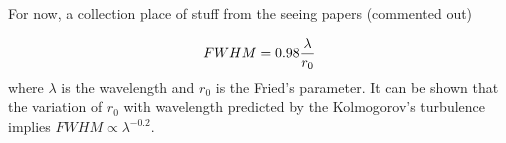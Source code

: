 
 
For now, a collection place of stuff from the seeing papers (commented out)






\begin{equation} 
FWHM = 0.98 {\lambda \over r_0} 
\end{equation} 
where $\lambda$ is the wavelength and $r_0$ is the Fried's
parameter. It can be shown that the variation of $r_0$ with wavelength
predicted by the Kolmogorov's turbulence implies $FWHM \propto \lambda^{-0.2}$. 	




